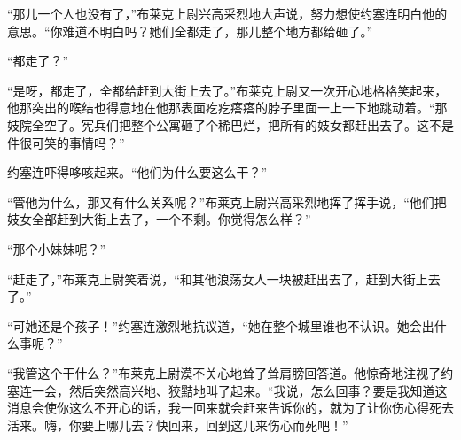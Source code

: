     “那儿一个人也没有了，”布莱克上尉兴高采烈地大声说，努力想使约塞连明白他的意思。“你难道不明白吗？她们全都走了，那儿整个地方都给砸了。”

    “都走了？”

    “是呀，都走了，全都给赶到大街上去了。”布莱克上尉又一次开心地格格笑起来，他那突出的喉结也得意地在他那表面疙疙瘩瘩的脖子里面一上一下地跳动着。“那妓院全空了。宪兵们把整个公寓砸了个稀巴烂，把所有的妓女都赶出去了。这不是件很可笑的事情吗？”

    约塞连吓得哆咳起来。“他们为什么要这么干？”

    “管他为什么，那又有什么关系呢？”布莱克上尉兴高采烈地挥了挥手说，“他们把妓女全部赶到大街上去了，一个不剩。你觉得怎么样？”

    “那个小妹妹呢？”

    “赶走了，”布莱克上尉笑着说，“和其他浪荡女人一块被赶出去了，赶到大街上去了。”

    “可她还是个孩子！”约塞连激烈地抗议道，“她在整个城里谁也不认识。她会出什么事呢？”

    “我管这个干什么？”布莱克上尉漠不关心地耸了耸肩膀回答道。他惊奇地注视了约塞连一会，然后突然高兴地、狡黠地叫了起来。“我说，怎么回事？要是我知道这消息会使你这么不开心的话，我一回来就会赶来告诉你的，就为了让你伤心得死去活来。嗨，你要上哪儿去？快回来，回到这儿来伤心而死吧！”
